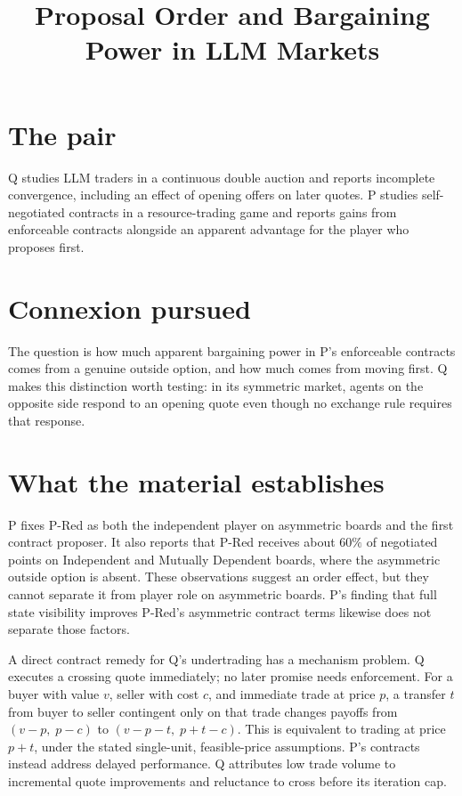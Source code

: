 \documentclass{article}
\title{Proposal Order and Bargaining Power in LLM Markets}
\begin{document}
\maketitle

\section*{The pair}

Q studies LLM traders in a continuous double auction and reports incomplete convergence, including an effect of opening offers on later quotes. P studies self-negotiated contracts in a resource-trading game and reports gains from enforceable contracts alongside an apparent advantage for the player who proposes first. 

\section*{Connexion pursued}

The question is how much apparent bargaining power in P's enforceable contracts comes from a genuine outside option, and how much comes from moving first. Q makes this distinction worth testing: in its symmetric market, agents on the opposite side respond to an opening quote even though no exchange rule requires that response. 

\section*{What the material establishes}

P fixes P-Red as both the independent player on asymmetric boards and the first contract proposer. It also reports that P-Red receives about \(60\%\) of negotiated points on Independent and Mutually Dependent boards, where the asymmetric outside option is absent. These observations suggest an order effect, but they cannot separate it from player role on asymmetric boards. P's finding that full state visibility improves P-Red's asymmetric contract terms likewise does not separate those factors. 

A direct contract remedy for Q's undertrading has a mechanism problem. Q executes a crossing quote immediately; no later promise needs enforcement. For a buyer with value \(v\), seller with cost \(c\), and immediate trade at price \(p\), a transfer \(t\) from buyer to seller contingent only on that trade changes payoffs from \((v-p,\;p-c)\) to \((v-p-t,\;p+t-c)\). This is equivalent to trading at price \(p+t\), under the stated single-unit, feasible-price assumptions. P's contracts instead address delayed performance. Q attributes low trade volume to incremental quote improvements and reluctance to cross before its iteration cap. 
\end{document}
